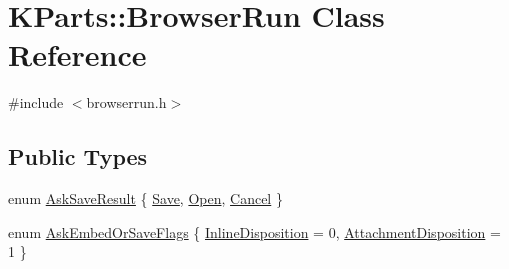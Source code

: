 \hypertarget{classKParts_1_1BrowserRun}{\section{\-K\-Parts\-:\-:\-Browser\-Run \-Class \-Reference}
\label{classKParts_1_1BrowserRun}
}


{\ttfamily \#include $<$browserrun.\-h$>$}

\subsection*{\-Public \-Types}
\begin{DoxyCompactItemize}
\item 
enum \hyperlink{classKParts_1_1BrowserRun_a32ee53f65c723ec01f4c4c28e91db8e6}{\-Ask\-Save\-Result} \{ \hyperlink{classKParts_1_1BrowserRun_a32ee53f65c723ec01f4c4c28e91db8e6adc6aa058c60662f393aa8168681d8a58}{\-Save}, 
\hyperlink{classKParts_1_1BrowserRun_a32ee53f65c723ec01f4c4c28e91db8e6ac44e1cbf269e6df9367051c7561de90b}{\-Open}, 
\hyperlink{classKParts_1_1BrowserRun_a32ee53f65c723ec01f4c4c28e91db8e6aea88673d252dcf7b37559606ce45667f}{\-Cancel}
 \}
\item 
enum \hyperlink{classKParts_1_1BrowserRun_ae78b4e6186491175ccdb4b0f2693c08d}{\-Ask\-Embed\-Or\-Save\-Flags} \{ \hyperlink{classKParts_1_1BrowserRun_ae78b4e6186491175ccdb4b0f2693c08dafa80faaf171d25b4a0e095a2c1f51cfe}{\-Inline\-Disposition} =  0, 
\hyperlink{classKParts_1_1BrowserRun_ae78b4e6186491175ccdb4b0f2693c08daa236cc4b09fc3ca6f88d9a37b32ea8af}{\-Attachment\-Disposition} =  1
 \}
\end{DoxyCompactItemize}
